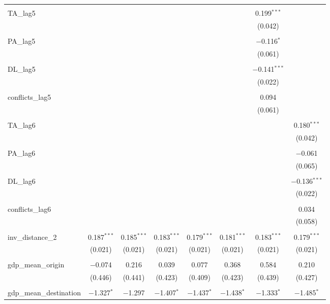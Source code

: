 \begin{table}[!htbp]
\begin{tabular}{@{\extracolsep{5pt}}lccccccc}
  & & & & & & & \\ 
 TA\_lag5 &  &  &  &  &  & 0.199$^{***}$ &  \\ 
  &  &  &  &  &  & (0.042) &  \\ 
  & & & & & & & \\ 
 PA\_lag5 &  &  &  &  &  & $-$0.116$^{*}$ &  \\ 
  &  &  &  &  &  & (0.061) &  \\ 
  & & & & & & & \\ 
 DL\_lag5 &  &  &  &  &  & $-$0.141$^{***}$ &  \\ 
  &  &  &  &  &  & (0.022) &  \\ 
  & & & & & & & \\ 
 conflicts\_lag5 &  &  &  &  &  & 0.094 &  \\ 
  &  &  &  &  &  & (0.061) &  \\ 
  & & & & & & & \\ 
 TA\_lag6 &  &  &  &  &  &  & 0.180$^{***}$ \\ 
  &  &  &  &  &  &  & (0.042) \\ 
  & & & & & & & \\ 
 PA\_lag6 &  &  &  &  &  &  & $-$0.061 \\ 
  &  &  &  &  &  &  & (0.065) \\ 
  & & & & & & & \\ 
 DL\_lag6 &  &  &  &  &  &  & $-$0.136$^{***}$ \\ 
  &  &  &  &  &  &  & (0.022) \\ 
  & & & & & & & \\ 
 conflicts\_lag6 &  &  &  &  &  &  & 0.034 \\ 
  &  &  &  &  &  &  & (0.058) \\ 
  & & & & & & & \\ 
 inv\_distance\_2 & 0.187$^{***}$ & 0.185$^{***}$ & 0.183$^{***}$ & 0.179$^{***}$ & 0.181$^{***}$ & 0.183$^{***}$ & 0.179$^{***}$ \\ 
  & (0.021) & (0.021) & (0.021) & (0.021) & (0.021) & (0.021) & (0.021) \\ 
  & & & & & & & \\ 
 gdp\_mean\_origin & $-$0.074 & 0.216 & 0.039 & 0.077 & 0.368 & 0.584 & 0.210 \\ 
  & (0.446) & (0.441) & (0.423) & (0.409) & (0.423) & (0.439) & (0.427) \\ 
  & & & & & & & \\ 
 gdp\_mean\_destination & $-$1.327$^{*}$ & $-$1.297 & $-$1.407$^{*}$ & $-$1.437$^{*}$ & $-$1.438$^{*}$ & $-$1.333$^{*}$ & $-$1.485$^{*}$ \\ 

\end{tabular}
\end{table}
